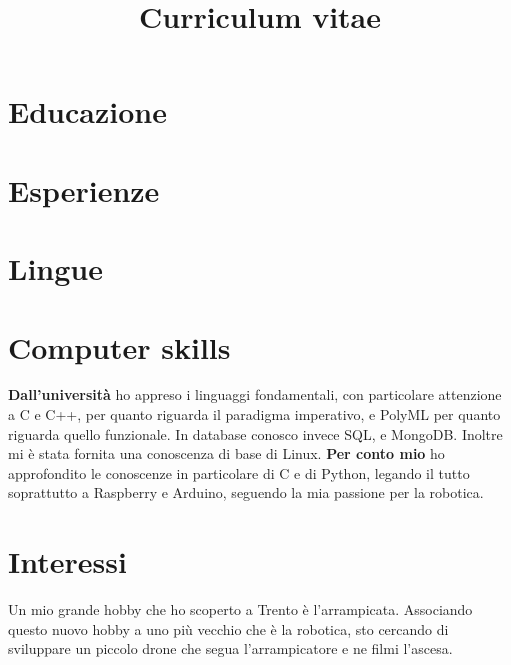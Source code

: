 \documentclass[11pt,a4paper,sans]{moderncv}        %
\title{Curriculum vitae}                               %
\begin{document}
\makecvtitle

\section{Educazione}

\section{Esperienze}

\section{Lingue}

\section{Computer skills}
\textbf{Dall'università} ho appreso i linguaggi fondamentali, con particolare attenzione a C e C++, per quanto riguarda il paradigma imperativo, e PolyML per quanto riguarda quello funzionale. In database conosco invece SQL, e MongoDB. Inoltre mi è stata fornita una conoscenza di base di Linux.\newline
\textbf{Per conto mio} ho approfondito le conoscenze in particolare di C e di Python, legando il tutto soprattutto a Raspberry e Arduino, seguendo la mia passione per la robotica. \newline

\section{Interessi}
Un mio grande hobby che ho scoperto a Trento è l'arrampicata. Associando questo nuovo hobby a uno più vecchio che è la robotica, sto cercando di sviluppare un piccolo drone che segua l'arrampicatore e ne filmi l'ascesa. 
\end{document}
